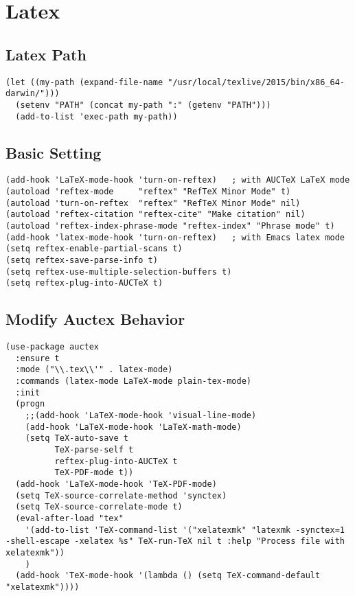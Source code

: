 \documentclass[11pt]{article}
\begin{document}
\section{Latex}
\label{sec:orgheadline38}
\subsection{Latex Path}
\label{sec:orgheadline31}
\begin{verbatim}
(let ((my-path (expand-file-name "/usr/local/texlive/2015/bin/x86_64-darwin/")))
  (setenv "PATH" (concat my-path ":" (getenv "PATH")))
  (add-to-list 'exec-path my-path))
\end{verbatim}
\subsection{Basic Setting}
\label{sec:orgheadline32}
\begin{verbatim}
(add-hook 'LaTeX-mode-hook 'turn-on-reftex)   ; with AUCTeX LaTeX mode
(autoload 'reftex-mode     "reftex" "RefTeX Minor Mode" t)
(autoload 'turn-on-reftex  "reftex" "RefTeX Minor Mode" nil)
(autoload 'reftex-citation "reftex-cite" "Make citation" nil)
(autoload 'reftex-index-phrase-mode "reftex-index" "Phrase mode" t)
(add-hook 'latex-mode-hook 'turn-on-reftex)   ; with Emacs latex mode
(setq reftex-enable-partial-scans t)
(setq reftex-save-parse-info t)
(setq reftex-use-multiple-selection-buffers t)
(setq reftex-plug-into-AUCTeX t)
\end{verbatim}
\subsection{Modify Auctex Behavior}
\label{sec:orgheadline33}
\begin{verbatim}
(use-package auctex
  :ensure t
  :mode ("\\.tex\\'" . latex-mode)
  :commands (latex-mode LaTeX-mode plain-tex-mode)
  :init
  (progn
    ;;(add-hook 'LaTeX-mode-hook 'visual-line-mode)
    (add-hook 'LaTeX-mode-hook 'LaTeX-math-mode)
    (setq TeX-auto-save t
          TeX-parse-self t
          reftex-plug-into-AUCTeX t
          TeX-PDF-mode t))
  (add-hook 'LaTeX-mode-hook 'TeX-PDF-mode)
  (setq TeX-source-correlate-method 'synctex)
  (setq TeX-source-correlate-mode t)
  (eval-after-load "tex"
    '(add-to-list 'TeX-command-list '("xelatexmk" "latexmk -synctex=1 -shell-escape -xelatex %s" TeX-run-TeX nil t :help "Process file with xelatexmk"))
    )
  (add-hook 'TeX-mode-hook '(lambda () (setq TeX-command-default "xelatexmk"))))
\end{verbatim}
\end{document}

